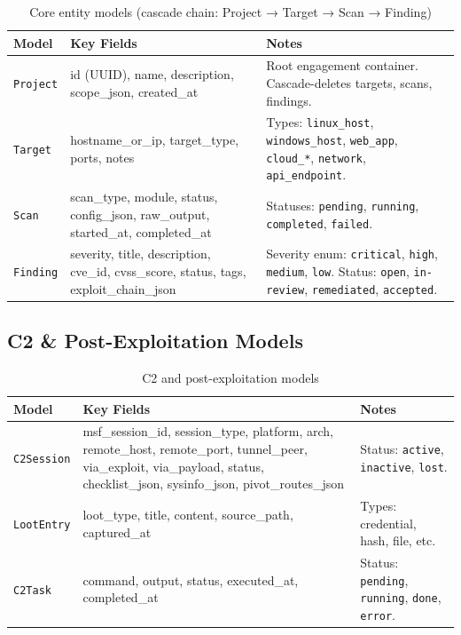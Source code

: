 \documentclass[11pt,a4paper,twoside,openright]{book}
\begin{document}
\begin{table}[H]
\centering
\begin{tabularx}{\textwidth}{L{3cm} L{4cm} X}
\toprule
\textbf{Model} & \textbf{Key Fields} & \textbf{Notes} \\
\midrule
\texttt{Project}   & id (UUID), name, description, scope\_json, created\_at & Root engagement container. Cascade-deletes targets, scans, findings. \\
\texttt{Target}    & hostname\_or\_ip, target\_type, ports, notes & Types: \texttt{linux\_host}, \texttt{windows\_host}, \texttt{web\_app}, \texttt{cloud\_*}, \texttt{network}, \texttt{api\_endpoint}. \\
\texttt{Scan}      & scan\_type, module, status, config\_json, raw\_output, started\_at, completed\_at & Statuses: \texttt{pending}, \texttt{running}, \texttt{completed}, \texttt{failed}. \\
\texttt{Finding}   & severity, title, description, cve\_id, cvss\_score, status, tags, exploit\_chain\_json & Severity enum: \texttt{critical}, \texttt{high}, \texttt{medium}, \texttt{low}. Status: \texttt{open}, \texttt{in-review}, \texttt{remediated}, \texttt{accepted}. \\
\bottomrule
\end{tabularx}
\caption{Core entity models (cascade chain: Project → Target → Scan → Finding)}
\end{table}

\subsection{C2 \& Post-Exploitation Models}

\begin{table}[H]
\centering
\begin{tabularx}{\textwidth}{L{3cm} L{4.5cm} X}
\toprule
\textbf{Model} & \textbf{Key Fields} & \textbf{Notes} \\
\midrule
\texttt{C2Session}  & msf\_session\_id, session\_type, platform, arch, remote\_host, remote\_port, tunnel\_peer, via\_exploit, via\_payload, status, checklist\_json, sysinfo\_json, pivot\_routes\_json & Status: \texttt{active}, \texttt{inactive}, \texttt{lost}. \\
\texttt{LootEntry}  & loot\_type, title, content, source\_path, captured\_at & Types: credential, hash, file, etc. \\
\texttt{C2Task}     & command, output, status, executed\_at, completed\_at & Status: \texttt{pending}, \texttt{running}, \texttt{done}, \texttt{error}. \\
\bottomrule
\end{tabularx}
\caption{C2 and post-exploitation models}
\end{table}
\end{document}
